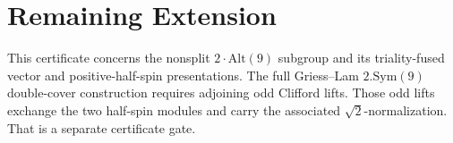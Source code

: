 \documentclass[11pt]{article}
\theoremstyle{remark}
\theoremstyle{plain}
\begin{document}
\section{Remaining Extension}

This certificate concerns the nonsplit \(2\!\cdot\!\mathrm{Alt}(9)\) subgroup and its
triality-fused vector and positive-half-spin presentations. The full Griess--Lam
\(2.\mathrm{Sym}(9)\) double-cover construction requires adjoining odd Clifford lifts. Those odd
lifts exchange the two half-spin modules and carry the associated \(\sqrt 2\)-normalization. That is
a separate certificate gate.
\end{document}
